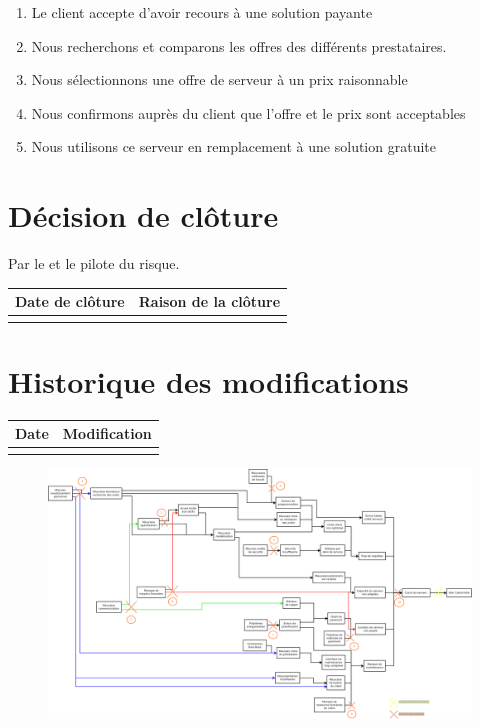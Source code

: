 \begin{enumerate}
	\item Le client accepte d'avoir recours à une solution payante
	\item Nous recherchons et comparons les offres des différents prestataires.
	\item Nous sélectionnons une offre de serveur à un prix raisonnable
	\item Nous confirmons auprès du client que l'offre et le prix sont acceptables
	\item Nous utilisons ce serveur en remplacement à une solution gratuite
\end{enumerate}

\section*{Décision de clôture}
Par le \CP{} et le pilote du risque.
\begin{table}[H]
\centering
	\begin{tabularx}{16.8cm}{|X|X|}
	\hline
	\rowcolor{gray!40} Date de clôture & Raison de la clôture \\
	\hline
	  & \\
	\hline
	\end{tabularx}
\end{table}

\section*{Historique des modifications}
\begin{table}[H]
\centering
	\begin{tabularx}{16.8cm}{|X|X|}
	\hline
	Date & Modification \\
	\hline
	  & \\
	\hline
	\end{tabularx}
\end{table}
\newpage

\begin{landscape}
\begin{figure}
	\centering
	\includegraphics[scale=0.35]{images/AnalyseRisque_nPourquoi_FDR001.png}
\end{figure}
\end{landscape}